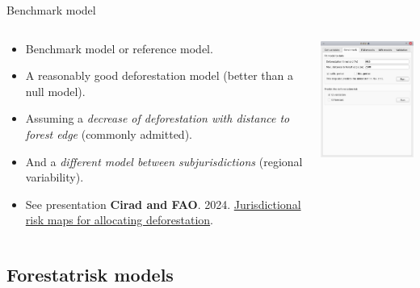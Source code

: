 \documentclass[10pt,table,dvipsnames,compress]{beamer}
\begin{document}
\begin{frame}[label={sec:org46860d4}]{Benchmark model}
\begin{columns}
\begin{column}{0.5\columnwidth}
\begin{itemize}
\item Benchmark model or reference model.
\item A reasonably good deforestation model (better than a null model).
\item Assuming a \emph{decrease of deforestation with distance to forest edge} (commonly admitted).
\item And a \emph{different model between subjurisdictions} (regional variability).
\item See presentation \textbf{Cirad and FAO}. 2024. \href{https://deforisk-qgis-plugin.org/\_static/references/Cirad2024-riskmap-verra.pdf}{Jurisdictional risk maps for allocating deforestation}.
\end{itemize}
\end{column}

\begin{column}{0.5\columnwidth}
\begin{center}
\includegraphics[width=5cm]{figs/plugin_api/interface_benchmark.png}
\end{center}  
\end{column}
\end{columns}
\end{frame}

\subsection{Forestatrisk models}
\label{sec:org0b990cb}
\end{document}
